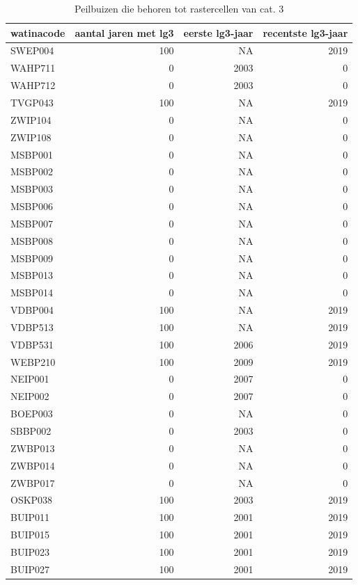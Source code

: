 \documentclass[11pt,]{book}
\begin{document}
\begin{table}

\caption{\label{tab:tubes-cat3-bis}Peilbuizen die behoren tot rastercellen van cat. 3}
\centering
\begin{tabular}[t]{l|r|r|r}
\hline
watinacode & aantal jaren met lg3 & eerste lg3-jaar & recentste lg3-jaar\\
\hline
SWEP004 & 100 & NA & 2019\\
\hline
WAHP711 & 0 & 2003 & 0\\
\hline
WAHP712 & 0 & 2003 & 0\\
\hline
TVGP043 & 100 & NA & 2019\\
\hline
ZWIP104 & 0 & NA & 0\\
\hline
ZWIP108 & 0 & NA & 0\\
\hline
MSBP001 & 0 & NA & 0\\
\hline
MSBP002 & 0 & NA & 0\\
\hline
MSBP003 & 0 & NA & 0\\
\hline
MSBP006 & 0 & NA & 0\\
\hline
MSBP007 & 0 & NA & 0\\
\hline
MSBP008 & 0 & NA & 0\\
\hline
MSBP009 & 0 & NA & 0\\
\hline
MSBP013 & 0 & NA & 0\\
\hline
MSBP014 & 0 & NA & 0\\
\hline
VDBP004 & 100 & NA & 2019\\
\hline
VDBP513 & 100 & NA & 2019\\
\hline
VDBP531 & 100 & 2006 & 2019\\
\hline
WEBP210 & 100 & 2009 & 2019\\
\hline
NEIP001 & 0 & 2007 & 0\\
\hline
NEIP002 & 0 & 2007 & 0\\
\hline
BOEP003 & 0 & NA & 0\\
\hline
SBBP002 & 0 & 2003 & 0\\
\hline
ZWBP013 & 0 & NA & 0\\
\hline
ZWBP014 & 0 & NA & 0\\
\hline
ZWBP017 & 0 & NA & 0\\
\hline
OSKP038 & 100 & 2003 & 2019\\
\hline
BUIP011 & 100 & 2001 & 2019\\
\hline
BUIP015 & 100 & 2001 & 2019\\
\hline
BUIP023 & 100 & 2001 & 2019\\
\hline
BUIP027 & 100 & 2001 & 2019\\

\end{tabular}
\end{table}
\end{document}
